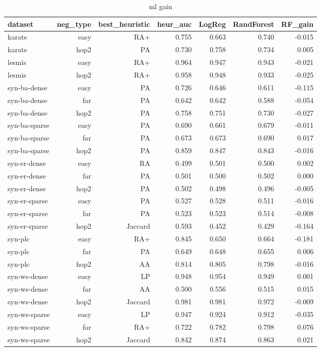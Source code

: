 \begin{table}[t]
\centering
\caption{ml gain}
\label{tab:ml_gain}
\begin{tabular}{lrrrrrr}
\hline
dataset & neg\_type & best\_heuristic & heur\_auc & LogReg & RandForest & RF\_gain \\
\hline
karate & easy & RA+ & 0.755 & 0.663 & 0.740 & -0.015 \\
karate & hop2 & PA & 0.730 & 0.758 & 0.734 & 0.005 \\
lesmis & easy & RA+ & 0.964 & 0.947 & 0.943 & -0.021 \\
lesmis & hop2 & RA+ & 0.958 & 0.948 & 0.933 & -0.025 \\
syn-ba-dense & easy & PA & 0.726 & 0.646 & 0.611 & -0.115 \\
syn-ba-dense & far & PA & 0.642 & 0.642 & 0.588 & -0.054 \\
syn-ba-dense & hop2 & PA & 0.758 & 0.751 & 0.730 & -0.027 \\
syn-ba-sparse & easy & PA & 0.690 & 0.661 & 0.679 & -0.011 \\
syn-ba-sparse & far & PA & 0.673 & 0.673 & 0.690 & 0.017 \\
syn-ba-sparse & hop2 & PA & 0.859 & 0.847 & 0.843 & -0.016 \\
syn-er-dense & easy & RA & 0.499 & 0.501 & 0.500 & 0.002 \\
syn-er-dense & far & PA & 0.501 & 0.500 & 0.502 & 0.000 \\
syn-er-dense & hop2 & PA & 0.502 & 0.498 & 0.496 & -0.005 \\
syn-er-sparse & easy & PA & 0.527 & 0.528 & 0.511 & -0.016 \\
syn-er-sparse & far & PA & 0.523 & 0.523 & 0.514 & -0.008 \\
syn-er-sparse & hop2 & Jaccard & 0.593 & 0.452 & 0.429 & -0.164 \\
syn-plc & easy & RA+ & 0.845 & 0.650 & 0.664 & -0.181 \\
syn-plc & far & PA & 0.649 & 0.648 & 0.655 & 0.006 \\
syn-plc & hop2 & AA & 0.814 & 0.805 & 0.798 & -0.016 \\
syn-ws-dense & easy & LP & 0.948 & 0.954 & 0.949 & 0.001 \\
syn-ws-dense & far & AA & 0.500 & 0.556 & 0.515 & 0.015 \\
syn-ws-dense & hop2 & Jaccard & 0.981 & 0.981 & 0.972 & -0.009 \\
syn-ws-sparse & easy & LP & 0.947 & 0.924 & 0.912 & -0.035 \\
syn-ws-sparse & far & RA+ & 0.722 & 0.782 & 0.798 & 0.076 \\
syn-ws-sparse & hop2 & Jaccard & 0.842 & 0.874 & 0.863 & 0.021 \\
\hline
\end{tabular}
\end{table}